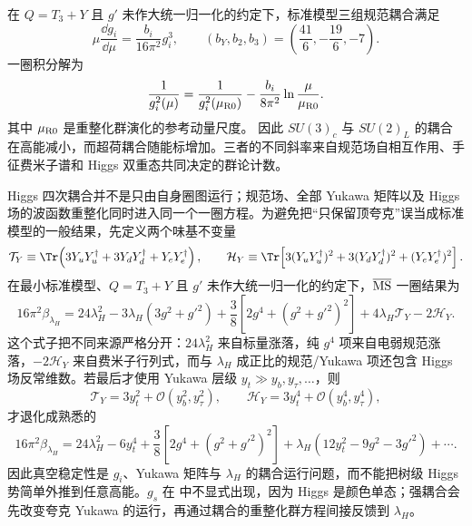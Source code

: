 在 $Q=T_3+Y$ 且 $g'$ 未作大统一归一化的约定下，标准模型三组规范耦合满足
\begin{equation}
{
\mu\frac{\dd g_i}{\dd\mu}
=\frac{b_i}{16\pi^2}g_i^3,
\qquad
(b_Y,b_2,b_3)=\left(\frac{41}{6},-\frac{19}{6},-7\right).}
\label{eq:sm-gauge-beta-one-loop-dp11}
\end{equation}
一圈积分解为
\begin{equation}
{
\frac1{g_i^2(\mu)}
=\frac1{g_i^2(\mu_{\rm R0})}
-\frac{b_i}{8\pi^2}\ln\frac\mu{\mu_{\rm R0}}.}
\label{eq:sm-gauge-running-dp11}
\end{equation}
其中 $\mu_{\rm R0}$ 是重整化群演化的参考动量尺度。
因此 $SU(3)_c$ 与 $SU(2)_L$ 的耦合在高能减小，而超荷耦合随能标增加。三者的不同斜率来自规范场自相互作用、手征费米子谱和 Higgs 双重态共同决定的群论计数。

Higgs 四次耦合并不是只由自身圈图运行；规范场、全部 Yukawa 矩阵以及 Higgs 场的波函数重整化同时进入同一个一圈方程。为避免把“只保留顶夸克”误当成标准模型的一般结果，先定义两个味基不变量
\begin{equation*}
 \mathcal T_Y\equiv
 \Tr\!\left(3Y_uY_u^\dagger+3Y_dY_d^\dagger+Y_eY_e^\dagger\right),
 \qquad
 \mathcal H_Y\equiv
 \Tr\!\left[3(Y_uY_u^\dagger)^2+3(Y_dY_d^\dagger)^2+(Y_eY_e^\dagger)^2\right].
\end{equation*}
在最小标准模型、$Q=T_3+Y$ 且 $g'$ 未作大统一归一化的约定下，$\overline{\rm MS}$ 一圈结果为
\begin{equation}
{
16\pi^2\beta_{\lambda_H}
=24\lambda_H^2
-3\lambda_H(3g^2+g'^2)
+\frac38\!\left[2g^4+(g^2+g'^2)^2\right]
+4\lambda_H\mathcal T_Y-2\mathcal H_Y.}
\label{eq:sm-higgs-quartic-beta-dp93}
\end{equation}
这个式子把不同来源严格分开：$24\lambda_H^2$ 来自标量涨落，纯 $g^4$ 项来自电弱规范涨落，$-2\mathcal H_Y$ 来自费米子行列式，而与 $\lambda_H$ 成正比的规范/Yukawa 项还包含 Higgs 场反常维数。若最后才使用 Yukawa 层级 $y_t\gg y_b,y_\tau,\ldots$，则
\begin{equation*}
 \mathcal T_Y=3y_t^2+\mathcal O(y_b^2,y_\tau^2),
 \qquad
 \mathcal H_Y=3y_t^4+\mathcal O(y_b^4,y_\tau^4),
\end{equation*}
才退化成熟悉的
\begin{equation*}
16\pi^2\beta_{\lambda_H}
=24\lambda_H^2-6y_t^4
+\frac38\left[2g^4+(g^2+g'^2)^2\right]
+\lambda_H(12y_t^2-9g^2-3g'^2)+\cdots.
\end{equation*}
因此真空稳定性是 $g_i$、Yukawa 矩阵与 $\lambda_H$ 的耦合运行问题，而不能把树级 Higgs 势简单外推到任意高能。$g_s$ 在 中不显式出现，因为 Higgs 是颜色单态；强耦合会先改变夸克 Yukawa 的运行，再通过耦合的重整化群方程间接反馈到 $\lambda_H$。

